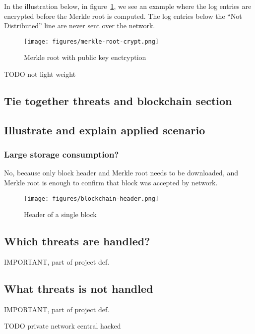 In the illustration below, in figure~\ref{fig:merkle-root-crypt}, we
see an example where the log entries are encrypted before the Merkle
root is computed. The log entries below the ``Not Distributed'' line
are never sent over the network.

\begin{figure}[H]
  \centering
  \texttt{[image: figures/merkle-root-crypt.png]}
  \caption{\label{fig:merkle-root-crypt} Merkle root with public key enctryption}
\end{figure}


TODO not light weight


\subsection{Tie together threats and blockchain section}

\subsection{Illustrate and explain applied scenario}

\subsubsection{Large storage consumption?}
No, because only block header and Merkle root needs to be downloaded,
and Merkle root is enough to confirm that block was accepted by
network.

\begin{figure}[ht]
  \centering
  \texttt{[image: figures/blockchain-header.png]}
  \caption{\label{fig:blockchain-header} Header of a single block}
\end{figure}


\subsection{Which threats are handled?}
IMPORTANT, part of project def.

\subsection{What threats is not handled}
IMPORTANT, part of project def.


TODO private network central hacked
